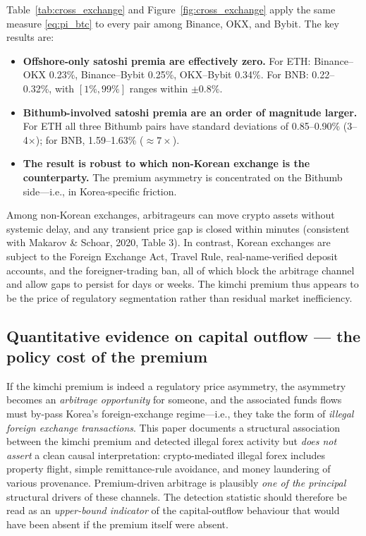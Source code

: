 \documentclass[11pt,a4paper]{article}
\begin{document}
Table~\ref{tab:cross_exchange} and Figure~\ref{fig:cross_exchange} apply the same measure
\eqref{eq:pi_btc} to every pair among Binance, OKX, and Bybit. The key results are:
\begin{itemize}
\item \textbf{Offshore-only satoshi premia are effectively zero.} For ETH: Binance--OKX 0.23\%,
Binance--Bybit 0.25\%, OKX--Bybit 0.34\%. For BNB: 0.22--0.32\%, with $[1\%, 99\%]$ ranges within
$\pm 0.8\%$.
\item \textbf{Bithumb-involved satoshi premia are an order of magnitude larger.} For ETH all three
Bithumb pairs have standard deviations of 0.85--0.90\% (3--4$\times$); for BNB, 1.59--1.63\%
($\approx 7\times$).
\item \textbf{The result is robust to which non-Korean exchange is the counterparty.} The premium
asymmetry is concentrated on the Bithumb side---i.e., in Korea-specific friction.
\end{itemize}

Among non-Korean exchanges, arbitrageurs can move crypto assets without systemic delay, and any
transient price gap is closed within minutes (consistent with Makarov \& Schoar, 2020, Table 3). In
contrast, Korean exchanges are subject to the Foreign Exchange Act, Travel Rule, real-name-verified
deposit accounts, and the foreigner-trading ban, all of which block the arbitrage channel and allow
gaps to persist for days or weeks. The kimchi premium thus appears to be the price of regulatory
segmentation rather than residual market inefficiency.

\subsection{Quantitative evidence on capital outflow --- the policy cost of the premium}
\label{sec:policy}

If the kimchi premium is indeed a regulatory price asymmetry, the asymmetry becomes an
\emph{arbitrage opportunity} for someone, and the associated funds flows must by-pass Korea's
foreign-exchange regime---i.e., they take the form of \emph{illegal foreign exchange transactions}.
This paper documents a structural association between the kimchi premium and detected illegal
forex activity but \emph{does not assert} a clean causal interpretation: crypto-mediated illegal
forex includes property flight, simple remittance-rule avoidance, and money laundering of various
provenance. Premium-driven arbitrage is plausibly \emph{one of the principal} structural drivers
of these channels. The detection statistic should therefore be read as an \emph{upper-bound
indicator} of the capital-outflow behaviour that would have been absent if the premium itself were
absent.
\end{document}
